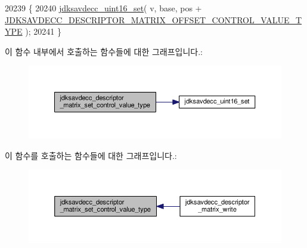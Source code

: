 \begin{DoxyCode}
20239 \{
20240     \hyperlink{group__endian_ga14b9eeadc05f94334096c127c955a60b}{jdksavdecc\_uint16\_set}( v, base, pos + 
      \hyperlink{group__descriptor__matrix_gab49e2b294086e236a2f3e36baf30379a}{JDKSAVDECC\_DESCRIPTOR\_MATRIX\_OFFSET\_CONTROL\_VALUE\_TYPE}
       );
20241 \}
\end{DoxyCode}


이 함수 내부에서 호출하는 함수들에 대한 그래프입니다.\+:
\nopagebreak
\begin{figure}[H]
\begin{center}
\leavevmode
\includegraphics[width=350pt]{group__descriptor__matrix_gaa4411e574c75890fe990f161a2477e7b_cgraph}
\end{center}
\end{figure}




이 함수를 호출하는 함수들에 대한 그래프입니다.\+:
\nopagebreak
\begin{figure}[H]
\begin{center}
\leavevmode
\includegraphics[width=350pt]{group__descriptor__matrix_gaa4411e574c75890fe990f161a2477e7b_icgraph}
\end{center}
\end{figure}


